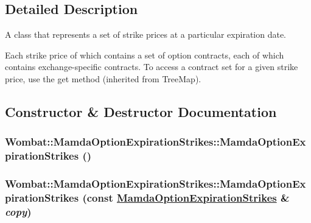 \subsection{Detailed Description}
A class that represents a set of strike prices at a particular expiration date. 

Each strike price of which contains a set of option contracts, each of which contains exchange-specific contracts. To access a contract set for a given strike price, use the get method (inherited from Tree\-Map). 



\subsection{Constructor \& Destructor Documentation}
\hypertarget{classWombat_1_1MamdaOptionExpirationStrikes_38ff90fa99a2ea10a5e8f5cf3d4da984}{
\subsubsection[MamdaOptionExpirationStrikes]{\setlength{\rightskip}{0pt plus 5cm}Wombat::Mamda\-Option\-Expiration\-Strikes::Mamda\-Option\-Expiration\-Strikes ()}}
\label{classWombat_1_1MamdaOptionExpirationStrikes_38ff90fa99a2ea10a5e8f5cf3d4da984}


\hypertarget{classWombat_1_1MamdaOptionExpirationStrikes_3c6f6097d3bb45e4dab2c7beb053fc72}{
\subsubsection[MamdaOptionExpirationStrikes]{\setlength{\rightskip}{0pt plus 5cm}Wombat::Mamda\-Option\-Expiration\-Strikes::Mamda\-Option\-Expiration\-Strikes (const \hyperlink{classWombat_1_1MamdaOptionExpirationStrikes}{Mamda\-Option\-Expiration\-Strikes} \& {\em copy})}}
\label{classWombat_1_1MamdaOptionExpirationStrikes_3c6f6097d3bb45e4dab2c7beb053fc72}


